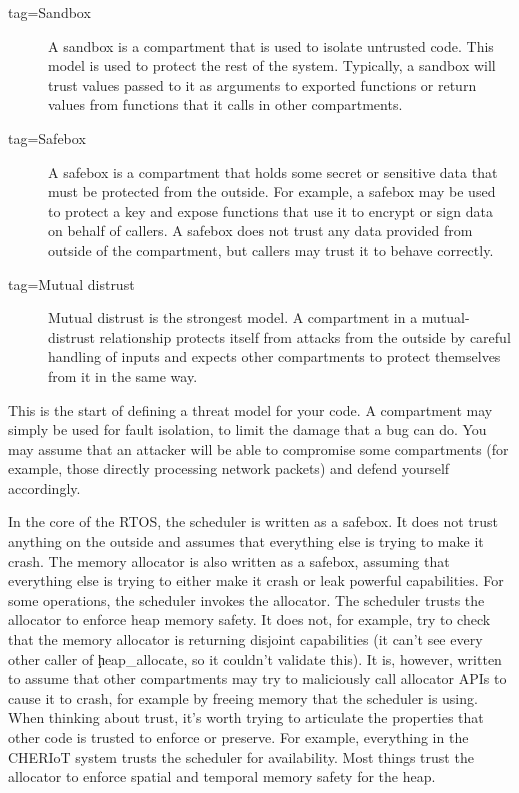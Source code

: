 \begin{description}
	\item[tag=Sandbox]{ A sandbox is a compartment that is used to isolate
		untrusted code.
		This model is used to protect the rest of the system.
		Typically, a sandbox will trust values passed to it as arguments to exported functions or return values from functions that it calls in other compartments.}
		\item[tag=Safebox]{ A safebox is a compartment that holds some secret or sensitive data that must be protected from the outside.
		For example, a safebox may be used to protect a key and expose functions that use it to encrypt or sign data on behalf of callers.
		A safebox does not trust any data provided from outside of the compartment, but callers may trust it to behave correctly.}
	\item[tag=Mutual distrust]{ Mutual distrust is the strongest model.
		A compartment in a mutual-distrust relationship protects itself from attacks from the outside by careful handling of inputs and expects other compartments to protect themselves from it in the same way.}
\end{description}

This is the start of defining a threat model for your code.
A compartment may simply be used for fault isolation, to limit the damage that a bug can do.
You may assume that an attacker will be able to compromise some compartments (for example, those directly processing network packets) and defend yourself accordingly.

In the core of the RTOS, the scheduler is written as a safebox.
It does not trust anything on the outside and assumes that everything else is trying to make it crash.
The memory allocator is also written as a safebox, assuming that everything else is trying to either make it crash or leak powerful capabilities.
For some operations, the scheduler invokes the allocator.
The scheduler trusts the allocator to enforce heap memory safety.
It does not, for example, try to check that the memory allocator is returning disjoint capabilities (it can't see every other caller of \c{heap_allocate}, so it couldn't validate this).
It is, however, written to assume that other compartments may try to maliciously call allocator APIs to cause it to crash, for example by freeing memory that the scheduler is using.
When thinking about trust, it's worth trying to articulate the properties that other code is trusted to enforce or preserve.
For example, everything in the CHERIoT system trusts the scheduler for availability.
Most things trust the allocator to enforce spatial and temporal memory safety for the heap.

